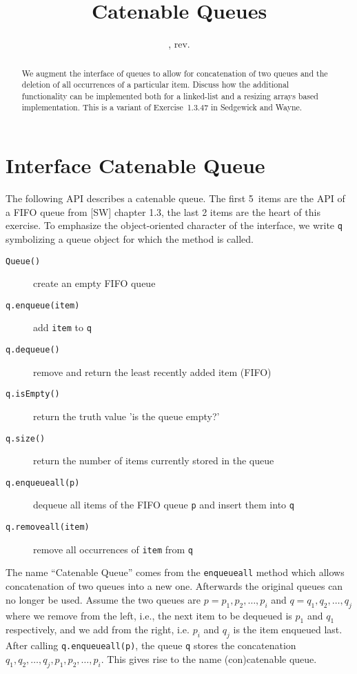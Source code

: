\documentclass{tufte-handout}
\title{Catenable Queues}
\author{}
\date{\GITAuthorDate, rev. \GITAbrHash}
\begin{document}
\maketitle

\begin{abstract}
  We augment the interface of queues to allow for concatenation of two queues and the deletion of all occurrences of a particular item.
  Discuss how the additional functionality can be implemented both for a linked-list and a resizing arrays based implementation.
  This is a variant of Exercise~1.3.47 in Sedgewick and Wayne.
\end{abstract}

\section{Interface Catenable Queue}

The following API describes a catenable queue. The first 5~items are the API of a FIFO queue from [SW] chapter 1.3, the last 2 items are the heart of this exercise.
To emphasize the object-oriented character of the interface, we write \texttt{q} symbolizing a queue object for which the method is called.
\begin{description}
\item [\texttt{Queue()}] create an empty FIFO queue
\item[\texttt{q.enqueue(item)}] add \texttt{item} to \texttt{q}
\item[\texttt{q.dequeue()}] remove and return the least recently added item (FIFO)
\item[\texttt{q.isEmpty()}] return the truth value 'is the queue empty?'
\item[\texttt{q.size()}] return the number of items currently stored in the queue
\item[\texttt{q.enqueueall(p)}] dequeue all items of the FIFO queue \texttt{p} and insert them into \texttt{q}
\item[\texttt{q.removeall(item)}] remove all occurrences of \texttt{item} from \texttt{q}
\end{description}

The name ``Catenable Queue'' comes from the \texttt{enqueueall} method which allows concatenation of two queues into a new one.
Afterwards the original queues can no longer be used.
Assume the two queues are $p=p_1,p_2,\ldots,p_i$ and $q=q_1,q_2,\ldots,q_j$ where we remove from the left, i.e., the next item to be {dequeued} is $p_1$ and $q_1$ respectively, and we add from the right, i.e. $p_i$ and $q_j$ is the item enqueued last.
After calling \texttt{q.enqueueall(p)}, the queue \texttt{q} stores the concatenation $q_1,q_2,\ldots,q_j,p_1,p_2,\ldots,p_i$.
This gives rise to the name (con)catenable queue.
\end{document}
